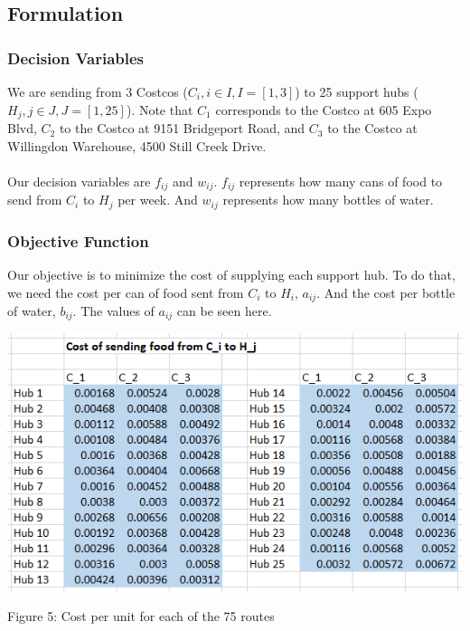 \documentclass{article}
\begin{document}
\subsection{Formulation}

\subsubsection{Decision Variables}
We are sending from 3 Costcos (\(C_i,i\in\!I,I=[1,3]\)) to 25 support hubs (\(H_j, j\in \!J, J=[1,25]\)). Note that \(C_1\) corresponds to the Costco at 605 Expo Blvd, \(C_2\) to the Costco at 9151 Bridgeport Road, and \(C_3\) to the Costco at Willingdon Warehouse, 4500 Still Creek Drive.
\\\\
\indent Our decision variables are \(f_{ij}\) and \(w_{ij}\). \(f_{ij}\) represents how many cans of food to send from \(C_i\) to \(H_j\) per week. And \(w_{ij}\) represents how many bottles of water.

\subsubsection{Objective Function}
Our objective is to minimize the cost of supplying each support hub. To do that, we need the cost per can of food sent from \(C_i\) to \(H_i\), \(a_{ij}\). And the cost per bottle of water, \(b_{ij}\). The values of \(a_{ij}\) can be seen here.

\begin{center}
    \includegraphics[scale=.4]{cost_from_ci_to_hj.png}
    
    \caption{Figure 5: Cost per unit for each of the 75 routes}
\end{center}
\end{document}
